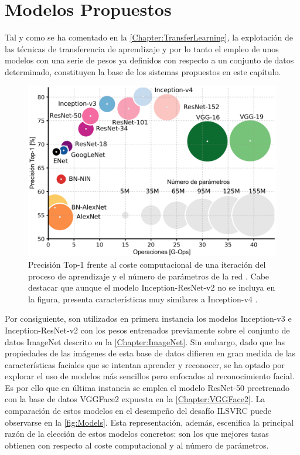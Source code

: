 \chapter{Modelos Propuestos} \label{Chapter:5}

Tal y como se ha comentado en la \autoref{Chapter:TransferLearning}, la explotación de las técnicas de transferencia de aprendizaje y por lo tanto el empleo de unos modelos con una serie de pesos ya definidos con respecto a un conjunto de datos determinado, constituyen la base de los sistemas propuestos en este capítulo.

\begin{figure}
    \centering
    \includegraphics[scale=0.25]{Images/Models.png}
    \caption{Precisión Top-1 frente al coste computacional de una iteración del proceso de aprendizaje y el número de parámetros de la red \cite{Models}. Cabe destacar que aunque el modelo Inception-ResNet-v2 no se incluya en la figura, presenta características muy similares a Inception-v4 \cite{Inception-ResNet}.}
    \label{fig:Models}
\end{figure}

Por consiguiente, son utilizados en primera instancia los modelos Inception-v3 \cite{Inception-v3} e Inception-ResNet-v2 \cite{Inception-ResNet} con los pesos entrenados previamente sobre el conjunto de datos ImageNet descrito en la \autoref{Chapter:ImageNet}. Sin embargo, dado que las propiedades de las imágenes de esta base de datos difieren en gran medida de las características faciales que se intentan aprender y reconocer, se ha optado por explorar el uso de modelos más sencillos pero enfocados al reconocimiento facial. Es por ello que en última instancia se emplea el modelo ResNet-50 preetrenado con la base de datos VGGFace2 expuesta en la \autoref{Chapter:VGGFace2}. La comparación de estos modelos en el desempeño del desafío ILSVRC puede observarse en la \autoref{fig:Models}. Esta representación, además, escenifica la principal razón de la elección de estos modelos concretos: son los que mejores tasas obtienen con respecto al coste computacional y al número de parámetros.

